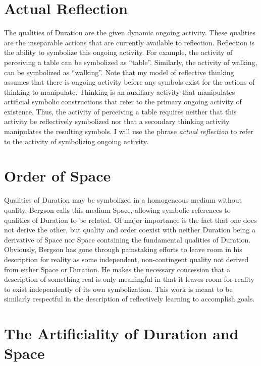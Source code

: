 \section{Actual Reflection}

The qualities of Duration are the given dynamic ongoing activity.
These qualities are the inseparable actions that are currently
available to reflection.  Reflection is the ability to symbolize this
ongoing activity.  For example, the activity of perceiving a table can
be symbolized as ``table''.  Similarly, the activity of walking, can
be symbolized as ``walking''.  Note that my model of reflective
thinking assumes that there is ongoing activity before any symbols
exist for the actions of thinking to manipulate.  Thinking is an
auxiliary activity that manipulates artificial symbolic constructions
that refer to the primary ongoing activity of existence.  Thus, the
activity of perceiving a table requires neither that this activity be
reflectively symbolized nor that a secondary thinking activity
manipulates the resulting symbols.  I will use the phrase \emph{actual
  reflection} to refer to the activity of symbolizing ongoing
activity.

\section{Order of Space}

Qualities of Duration may be symbolized in a homogeneous medium
without quality.  Bergson calls this medium Space, allowing symbolic
references to qualities of Duration to be related.  Of major
importance is the fact that one does not derive the other, but quality
and order coexist with neither Duration being a derivative of Space
nor Space containing the fundamental qualities of Duration.
Obviously, Bergson has gone through painstaking efforts to leave room
in his description for reality as some independent, non-contingent
quality not derived from either Space or Duration.  He makes the
necessary concession that a description of something real is only
meaningful in that it leaves room for reality to exist independently
of its own symbolization.  This work is meant to be similarly
respectful in the description of reflectively learning to accomplish
goals.

\section{The Artificiality of Duration and Space}
\label{section:the_artificiality_of_duration_and_space}

